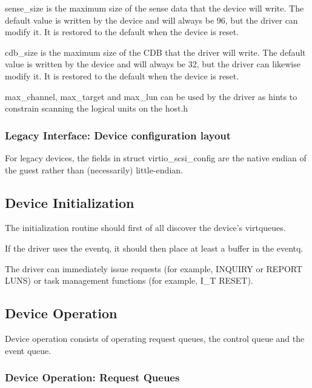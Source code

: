   sense_size is the maximum size of the sense data that the
    device will write. The default value is written by the device
    and will always be 96, but the driver can modify it. It is
    restored to the default when the device is reset.

  cdb_size is the maximum size of the CDB that the driver will
    write. The default value is written by the device and will
    always be 32, but the driver can likewise modify it. It is
    restored to the default when the device is reset.

  max_channel, max_target and max_lun can be used by the driver
    as hints to constrain scanning the logical units on the
    host.h

\subsubsection{Legacy Interface: Device configuration layout}\label{sec:Device Types / SCSI Host Device / Device configuration layout / Legacy Interface: Device configuration layout}
For legacy devices, the fields in struct virtio_scsi_config are the
native endian of the guest rather than (necessarily) little-endian.

\subsection{Device Initialization}\label{sec:Device Types / SCSI Host Device / Device Initialization}

The initialization routine should first of all discover the
device's virtqueues.

If the driver uses the eventq, it should then place at least a
buffer in the eventq.

The driver can immediately issue requests (for example, INQUIRY
or REPORT LUNS) or task management functions (for example, I_T
RESET).

\subsection{Device Operation}\label{sec:Device Types / SCSI Host Device / Device Operation}

Device operation consists of operating request queues, the control
queue and the event queue.

\subsubsection{Device Operation: Request Queues}\label{sec:Device Types / SCSI Host Device / Device Operation / Device Operation: Request Queues}

